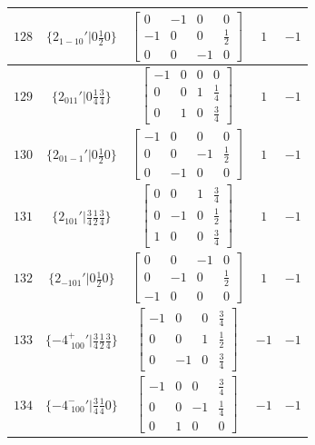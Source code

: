 \documentclass[fleqn,8pt]{jsarticle}
\begin{document}
\begin{longtable}{ccccc}
$ 128 $ & $ \{2{}_{1-10}{}'|0 \frac{1}{2} 0\} $ & $ \begin{bmatrix} 0 & -1 & 0 & 0 \\ -1 & 0 & 0 & \frac{1}{2} \\ 0 & 0 & -1 & 0 \end{bmatrix} $ & $ 1 $ & $ -1 $ \\ \hline
$ 129 $ & $ \{2{}_{011}{}'|0 \frac{1}{4} \frac{3}{4}\} $ & $ \begin{bmatrix} -1 & 0 & 0 & 0 \\ 0 & 0 & 1 & \frac{1}{4} \\ 0 & 1 & 0 & \frac{3}{4} \end{bmatrix} $ & $ 1 $ & $ -1 $ \\ \hline
$ 130 $ & $ \{2{}_{01-1}{}'|0 \frac{1}{2} 0\} $ & $ \begin{bmatrix} -1 & 0 & 0 & 0 \\ 0 & 0 & -1 & \frac{1}{2} \\ 0 & -1 & 0 & 0 \end{bmatrix} $ & $ 1 $ & $ -1 $ \\ \hline
$ 131 $ & $ \{2{}_{101}{}'|\frac{3}{4} \frac{1}{2} \frac{3}{4}\} $ & $ \begin{bmatrix} 0 & 0 & 1 & \frac{3}{4} \\ 0 & -1 & 0 & \frac{1}{2} \\ 1 & 0 & 0 & \frac{3}{4} \end{bmatrix} $ & $ 1 $ & $ -1 $ \\ \hline
$ 132 $ & $ \{2{}_{-101}{}'|0 \frac{1}{2} 0\} $ & $ \begin{bmatrix} 0 & 0 & -1 & 0 \\ 0 & -1 & 0 & \frac{1}{2} \\ -1 & 0 & 0 & 0 \end{bmatrix} $ & $ 1 $ & $ -1 $ \\ \hline
$ 133 $ & $ \{-4^{+}_{\,\,100}{}'|\frac{3}{4} \frac{1}{2} \frac{3}{4}\} $ & $ \begin{bmatrix} -1 & 0 & 0 & \frac{3}{4} \\ 0 & 0 & 1 & \frac{1}{2} \\ 0 & -1 & 0 & \frac{3}{4} \end{bmatrix} $ & $ -1 $ & $ -1 $ \\ \hline
$ 134 $ & $ \{-4^{-}_{\,\,100}{}'|\frac{3}{4} \frac{1}{4} 0\} $ & $ \begin{bmatrix} -1 & 0 & 0 & \frac{3}{4} \\ 0 & 0 & -1 & \frac{1}{4} \\ 0 & 1 & 0 & 0 \end{bmatrix} $ & $ -1 $ & $ -1 $ \\ \hline

\end{longtable}
\end{document}
